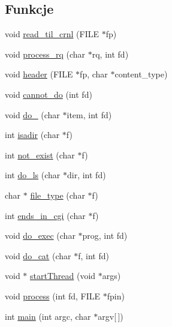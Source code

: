 \subsection*{Funkcje}
\begin{DoxyCompactItemize}
\item 
void \mbox{\hyperlink{10c-serwer_8c_aec3402ec3244a54e1bc086a1e1054755}{read\+\_\+til\+\_\+crnl}} (F\+I\+LE $\ast$fp)
\item 
void \mbox{\hyperlink{10c-serwer_8c_ad8ba6d5e4a00c2fff7a65af14096bd9b}{process\+\_\+rq}} (char $\ast$rq, int fd)
\item 
void \mbox{\hyperlink{10c-serwer_8c_adc7bfb1c892aecf61c0c73f3458caf90}{header}} (F\+I\+LE $\ast$fp, char $\ast$content\+\_\+type)
\item 
void \mbox{\hyperlink{10c-serwer_8c_a8e603d6f76a35b616135eb394f6ec080}{cannot\+\_\+do}} (int fd)
\item 
void \mbox{\hyperlink{10c-serwer_8c_ad3f91122750391e238cfbee3b88975ec}{do\+\_}} (char $\ast$item, int fd)
\item 
int \mbox{\hyperlink{10c-serwer_8c_a68ac50fc5196973b9f3ef7b4992f7279}{isadir}} (char $\ast$f)
\item 
int \mbox{\hyperlink{10c-serwer_8c_a963f754c08801de5f56c78f1b26e3a86}{not\+\_\+exist}} (char $\ast$f)
\item 
int \mbox{\hyperlink{10c-serwer_8c_a83999b0603c38aa5fe08f7ed801e6cfe}{do\+\_\+ls}} (char $\ast$dir, int fd)
\item 
char $\ast$ \mbox{\hyperlink{10c-serwer_8c_a29b9ee72561809560e62a9ea307d1ff6}{file\+\_\+type}} (char $\ast$f)
\item 
int \mbox{\hyperlink{10c-serwer_8c_ad3ef3c593d3a792b02a341450eaa62dd}{ends\+\_\+in\+\_\+cgi}} (char $\ast$f)
\item 
void \mbox{\hyperlink{10c-serwer_8c_a0a305ff573da158eaa9484e5506921c0}{do\+\_\+exec}} (char $\ast$prog, int fd)
\item 
void \mbox{\hyperlink{10c-serwer_8c_adab7e9f2617cceb5752ef3f97cfc2ef1}{do\+\_\+cat}} (char $\ast$f, int fd)
\item 
void $\ast$ \mbox{\hyperlink{10c-serwer_8c_a3284b2d42b5781f981bdffb62bedcb01}{start\+Thread}} (void $\ast$args)
\item 
void \mbox{\hyperlink{10c-serwer_8c_a182f39efe710f6e9bf678baa9e8eafa3}{process}} (int fd, F\+I\+LE $\ast$fpin)
\item 
int \mbox{\hyperlink{10c-serwer_8c_a0ddf1224851353fc92bfbff6f499fa97}{main}} (int argc, char $\ast$argv\mbox{[}$\,$\mbox{]})
\end{DoxyCompactItemize}


